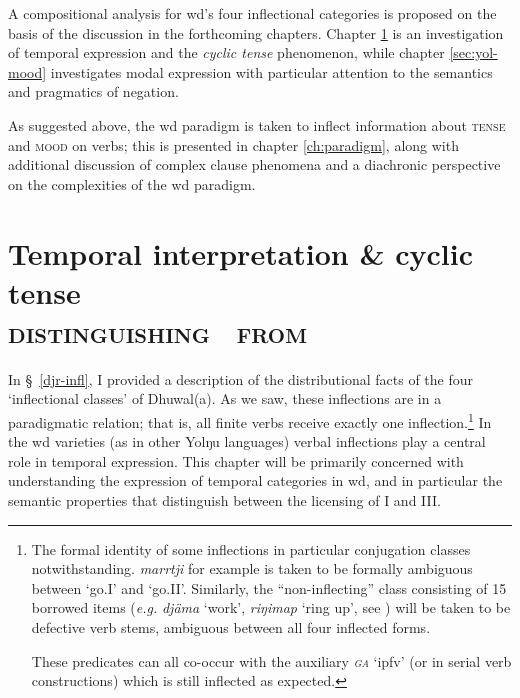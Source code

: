 A compositional analysis for \acrshort{wd}'s four inflectional categories is proposed on the basis of the discussion in the forthcoming chapters. Chapter \ref{sec:djr-temp} is an investigation of temporal expression and the \textit{cyclic tense} phenomenon, while chapter \ref{sec:yol-mood} investigates modal expression with particular attention to the semantics and pragmatics of negation.

 As suggested above, the \acrshort{wd} paradigm is taken to inflect information about \textsc{tense} and \textsc{mood} on verbs; this is presented in chapter \ref{ch:paradigm}, along with additional discussion of complex clause phenomena and a diachronic perspective on the complexities of the \gls{wd} paradigm.
 


\chapter{Temporal interpretation \& cyclic tense\\{\large \textsc{distinguishing \I~from \III}}}\label{sec:djr-temp}

\noindent In §~\ref{djr-infl}, I provided a description of the distributional facts of the four `inflectional classes' of Dhuwal(a). As we saw, these inflections are in a paradigmatic relation; that is, all finite verbs receive exactly one inflection.\footnote{The formal identity of some inflections in particular conjugation classes notwithstanding. \textit{marrtji} for example is taken to be formally ambiguous between `go.\gls{I}' and `go.\gls{II}'. Similarly, the ``non-inflecting'' class consisting of 15 borrowed items (\textit{e.g.} \textit{djäma} `work', \textit{riŋimap} `ring up', see \citealp[308]{Wilkinson1991}) will be taken to be defective verb stems, ambiguous between all four inflected forms.
	
	 These predicates can all co-occur with the auxiliary \textit{\textsc{ga}} `\gls{ipfv}' (or in serial verb constructions) which is still inflected as expected.}
  In the \acrlong{wd} varieties (as in other Yolŋu languages) verbal inflections play a central role in temporal expression. This chapter will be primarily concerned with understanding the expression of temporal categories in \acrshort{wd}, and in particular the semantic properties that distinguish between the licensing of \gls{I} and \gls{III}.

